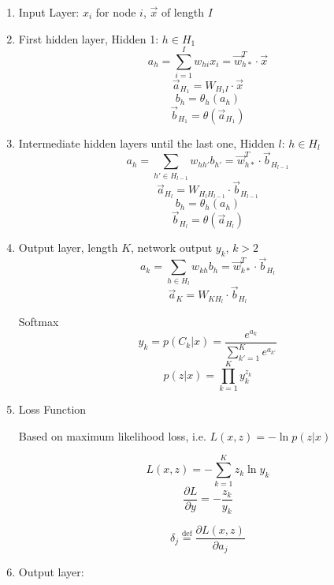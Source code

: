  \begin{enumerate}

 \item Input Layer: $x_i$ for node $i$, $\vec{x}$ of length $I$

 \item First hidden layer, Hidden 1: $h \in H_1$\\
	$$a_h = \sum_{i=1}^I w_{hi}x_i = \vec{w}_{h\ast}^T \cdot \vec{x}$$
	$$\vec{a}_{H_1} = W_{H_1 I} \cdot \vec{x}$$
	$$b_h = \theta_h (a_h)$$
	$$\vec{b}_{H_1} = \theta(\vec{a}_{H_1})$$

 \item Intermediate hidden layers until the last one, Hidden
	 $l$: $h \in H_l$\\
	 $$a_h = \sum_{h' \in H_{l-1}} w_{hh'}b_{h'} = \vec{w}_{h\ast}^T \cdot \vec{b}_{H_{l-1}}$$
		 $$\vec{a}_{H_l} = W_{H_l H_{l-1}} \cdot \vec{b}_{H_{l-1}}$$
	$$b_h = \theta_h (a_h)$$
	$$\vec{b}_{H_l} = \theta(\vec{a}_{H_l})$$

 \item Output layer, length $K$, network output $y_k$, $k>2$\\
	 $$a_k = \sum_{h \in H_l} w_{kh}b_h = \vec{w}_{k\ast}^T \cdot \vec{b}_{H_l}$$
	$$\vec{a}_K = W_{K H_l} \cdot \vec{b}_{H_l}$$

	Softmax
	 $$y_k = p(C_k|x) = \frac{e^{a_k}}{\sum_{k'=1}^K e^{a_{k'}}}$$
		 $$p(z|x) = \prod_{k=1}^K y_k^{z_k}$$

 \item Loss Function

 Based on maximum likelihood loss, i.e. $L(x,z) = -\ln p(z|x)$

 $$L(x,z) = -\sum_{k=1}^K z_k \ln y_k$$
 $$ \frac{\partial L}{\partial y} = - \frac{z_k}{y_k}$$

 $$\delta_j \overset{\text{def}}{=} \frac{\partial L(x,z)}{\partial a_j}$$

 \item Output layer:\\


\end{enumerate}
